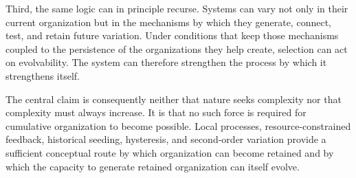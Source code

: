 \documentclass[11pt]{article}
\begin{document}
Third, the same logic can in principle recurse. Systems can vary not only in their current organization but in the mechanisms by which they generate, connect, test, and retain future variation. Under conditions that keep those mechanisms coupled to the persistence of the organizations they help create, selection can act on evolvability. The system can therefore strengthen the process by which it strengthens itself.

The central claim is consequently neither that nature seeks complexity nor that complexity must always increase. It is that no such force is required for cumulative organization to become possible. Local processes, resource-constrained feedback, historical seeding, hysteresis, and second-order variation provide a sufficient conceptual route by which organization can become retained and by which the capacity to generate retained organization can itself evolve.
\end{document}
